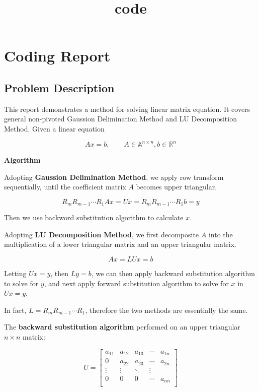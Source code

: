 \documentclass[11pt]{article}
\title{code}
\begin{document}
    
    \maketitle
    
    

    
    \hypertarget{coding-report}{%
\section{Coding Report}\label{coding-report}}

    \hypertarget{problem-description}{%
\subsection{Problem Description}\label{problem-description}}

This report demonstrates a method for solving linear matrix equation. It
covers general non-pivoted Gaussion Delimination Method and LU
Decomposition Method. Given a linear equation

\[ Ax = b,\qquad A\in\mathbb{A}^{n\times n},b\in\mathbb{R}^n \]

\textbf{Algorithm}

Adopting \textbf{Gaussion Delimination Method}, we apply row transform
sequentially, until the coefficient matrix \(A\) becomes upper
triangular,

\[ R_{m}R_{m-1}\cdots R_1 Ax = Ux = R_{m}R_{m-1}\cdots R_1 b = y \]

Then we use backword substitution algorithm to calculate \(x\).

Adopting \textbf{LU Decomposition Method}, we first decomposite \(A\)
into the multiplication of a lower triangular matrix and an upper
triangular matrix.

\[ Ax=LUx=b \]

Letting \(Ux=y\), then \(Ly=b\), we can then apply backward substitution
algorithm to solve for \(y\), and next apply forward substitution
algorithm to solve for \(x\) in \(Ux=y\).

In fact, \(L=R_{m}R_{m-1}\cdots R_1\), therefore the two methods are
essentially the same.

The \textbf{backward substitution algorithm} performed on an upper
triangular \(n\times n\) matrix:

\[
U=\begin{bmatrix} a_{11} & a_{12} & a_{13} & \cdots & a_{1n}\\
0 & a_{22} & a_{23} & \cdots & a_{2n}\\
\vdots & \vdots & \ddots & \vdots\\
0&0 & 0&\cdots & a_{nn}\\
\end{bmatrix} \]
\end{document}
